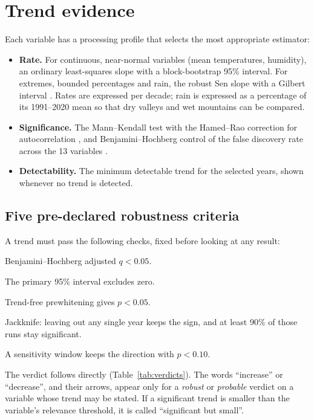 \documentclass[12pt, oneside, openany]{report}
\begin{document}
\section{Trend evidence}

Each variable has a processing profile that selects the most appropriate estimator:

\begin{itemize}[leftmargin=*]
    \item \textbf{Rate.} For continuous, near-normal variables (mean temperatures, humidity), an ordinary least-squares slope with a block-bootstrap 95\% interval. For extremes, bounded percentages and rain, the robust Sen slope \cite{sen1968} with a Gilbert interval \cite{gilbert1987}. Rates are expressed per decade; rain is expressed as a percentage of its 1991--2020 mean so that dry valleys and wet mountains can be compared.
    \item \textbf{Significance.} The Mann--Kendall test \cite{mann1945,kendall1975} with the Hamed--Rao correction for autocorrelation \cite{hamed1998}, and Benjamini--Hochberg control of the false discovery rate across the 13 variables \cite{bh1995}.
    \item \textbf{Detectability.} The minimum detectable trend for the selected years, shown whenever no trend is detected.
\end{itemize}

\subsection*{Five pre-declared robustness criteria}

A trend must pass the following checks, fixed before looking at any result:

\begin{description}[leftmargin=1.2cm, style=nextline]
    \item[R1] Benjamini--Hochberg adjusted $q < 0.05$.
    \item[R2] The primary 95\% interval excludes zero.
    \item[R3] Trend-free prewhitening \cite{yue2002tfpw} gives $p < 0.05$.
    \item[R4] Jackknife: leaving out any single year keeps the sign, and at least 90\% of those runs stay significant.
    \item[R5] A sensitivity window keeps the direction with $p < 0.10$.
\end{description}

The verdict follows directly (Table~\ref{tab:verdicts}). The words \enquote{increase} or \enquote{decrease}, and their arrows, appear only for a \emph{robust} or \emph{probable} verdict on a variable whose trend may be stated. If a significant trend is smaller than the variable's relevance threshold, it is called \enquote{significant but small}.
\end{document}
